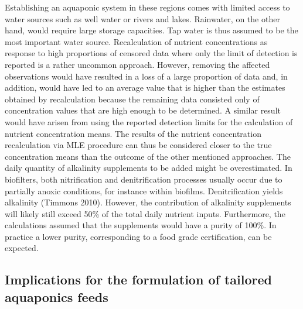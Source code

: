 \documentclass[preprint, 3p,
authoryear]{elsarticle} %
\begin{document}
Establishing an aquaponic system in these regions comes with limited
access to water sources such as well water or rivers and lakes.
Rainwater, on the other hand, would require large storage capacities.
Tap water is thus assumed to be the most important water source.
Recalculation of nutrient concentrations as response to high proportions
of censored data where only the limit of detection is reported is a
rather uncommon approach. However, removing the affected observations
would have resulted in a loss of a large proportion of data and, in
addition, would have led to an average value that is higher than the
estimates obtained by recalculation because the remaining data consisted
only of concentration values that are high enough to be determined. A
similar result would have arisen from using the reported detection
limits for the calculation of nutrient concentration means. The results
of the nutrient concentration recalculation via MLE procedure can thus
be considered closer to the true concentration means than the outcome of
the other mentioned approaches. The daily quantity of alkalinity
supplements to be added might be overestimated. In biofilters, both
nitrification and denitrification processes usually occur due to
partially anoxic conditions, for instance within biofilms.
Denitrification yields alkalinity (Timmons 2010). However, the
contribution of alkalinity supplements will likely still exceed 50\% of
the total daily nutrient inputs. Furthermore, the calculations assumed
that the supplements would have a purity of 100\%. In practice a lower
purity, corresponding to a food grade certification, can be expected.

\hypertarget{implications-for-the-formulation-of-tailored-aquaponics-feeds}{%
\subsection{Implications for the formulation of tailored aquaponics
feeds}\label{implications-for-the-formulation-of-tailored-aquaponics-feeds}}
\end{document}
